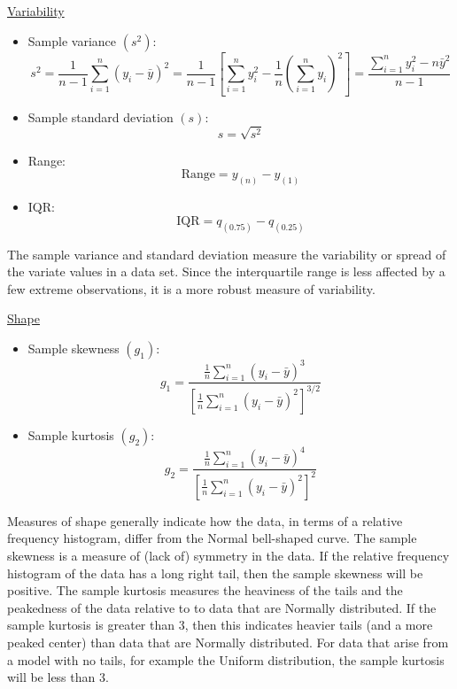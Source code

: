 \underline{Variability}
\begin{itemize}
    \item Sample variance $ \left( s^2 \right) $:
          \[ s^{2}=\frac{1}{n-1} \sum_{i=1}^{n}\left(y_{i}-\bar{y}\right)^{2}
              =\frac{1}{n-1}\left[\sum_{i=1}^{n} y_{i}^{2}-\frac{1}{n}
                  \left(\sum_{i=1}^{n} y_{i}\right)^{2}\right]
              =\frac{\sum_{i=1}^{n} y_{i}^{2}-n \bar{y}^{2}}{n-1} \]
    \item Sample standard deviation $ \left( s \right) $:
          \[ s=\sqrt{s^2} \]
    \item Range:
          \[ \text{Range}=y_{(n)}-y_{(1)} \]
    \item IQR\@:
          \[ \text{IQR}=q_{(0.75)}-q_{(0.25)} \]
\end{itemize}
The sample variance and standard deviation measure the variability or spread of the
variate values in a data set. Since the interquartile range is less affected
by a few extreme observations, it is a more robust measure of variability.

\underline{Shape}
\begin{itemize}
    \item Sample skewness $ (g_1) $:
          \[g_{1}=\frac{\frac{1}{n}
                  \sum_{i=1}^{n}\left(y_{i}-\bar{y}\right)^{3}}{\left[\frac{1}{n} \sum_{i=1}^{n}\left(y_{i}-\bar{y}\right)^{2}\right]^{3 / 2}}\]
    \item Sample kurtosis $ (g_2) $:
          \[g_{2}=\frac{\frac{1}{n} \sum_{i=1}^{n}\left(y_{i}-\bar{y}\right)^{4}}{\left[\frac{1}{n} \sum_{i=1}^{n}\left(y_{i}-\bar{y}\right)^{2}\right]^{2}}\]
\end{itemize}
Measures of shape generally indicate how the data, in terms of a relative frequency
histogram, differ from the Normal bell-shaped curve. The sample skewness is a measure
of (lack of) symmetry in the data. If the relative frequency histogram
of the data has a long right tail, then the sample skewness will be positive.
The sample kurtosis measures the heaviness of the tails and the peakedness of the data
relative to to data that are Normally distributed. If the sample kurtosis is greater than 3,
then this indicates heavier tails (and a more peaked center) than data that are Normally distributed.
For data that arise from a model with no tails, for example the Uniform distribution, the sample
kurtosis will be less than 3.

